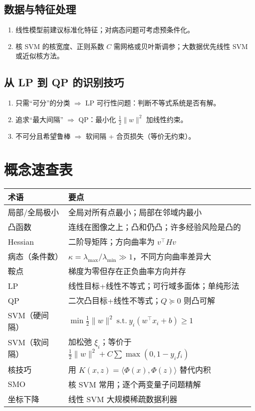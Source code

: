 \documentclass[10.5pt,hyperref,a4paper,UTF8]{ctexart}
\theoremstyle{definition}
\begin{document}
\subsection{数据与特征处理}
\begin{enumerate}
  \item 线性模型前建议标准化特征；对病态问题可考虑预条件化。
  \item 核 SVM 的核宽度、正则系数 $C$ 需网格或贝叶斯调参；大数据优先线性 SVM 或近似核方法。
\end{enumerate}

\subsection{从 LP 到 QP 的识别技巧}
\begin{enumerate}
  \item 只需“可分”的分类 $\Rightarrow$ LP 可行性问题：判断不等式系统是否有解。
  \item 追求“最大间隔” $\Rightarrow$ QP：最小化 $\frac12\lVert w\rVert^2$ 加线性约束。
  \item 不可分且希望鲁棒 $\Rightarrow$ 软间隔 + 合页损失（等价无约束）。
\end{enumerate}

\section{概念速查表}

\begin{center}
\renewcommand{\arraystretch}{1.3}
\begin{tabular}{p{3cm}p{11cm}}
\toprule
术语 & 要点 \\
\midrule
局部/全局极小 & 全局对所有点最小；局部在邻域内最小 \\
凸函数 & 连线在图像之上；凸和仍凸；许多经验风险是凸的 \\
Hessian & 二阶导矩阵；方向曲率为 $v^\top H v$ \\
病态（条件数） & $\kappa=\lambda_{\max}/\lambda_{\min}\gg 1$，不同方向曲率差异大 \\
鞍点 & 梯度为零但存在正负曲率方向并存 \\
LP & 线性目标+线性不等式；可行域多面体；单纯形法 \\
QP & 二次凸目标+线性不等式；$Q\succeq 0$ 则凸可解 \\
SVM（硬间隔） & $\min \frac12\lVert w\rVert^2\ \text{s.t.}\ y_i(w^\top x_i+b)\ge 1$ \\
SVM（软间隔） & 加松弛 $\xi_i$；等价于 $\frac12\lVert w\rVert^2+C\sum \max(0,1-y_if_i)$ \\
核技巧 & 用 $K(x,z)=\langle \Phi(x),\Phi(z)\rangle$ 替代内积 \\
SMO & 核 SVM 常用；逐个两变量子问题精解 \\
坐标下降 & 线性 SVM 大规模稀疏数据利器 \\
\bottomrule
\end{tabular}
\end{center}
\end{document}
